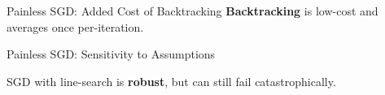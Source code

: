 \documentclass[mathserif,notheorems, hyperref={colorlinks, citecolor=blue, urlcolor=blue, linkcolor=blue}]{beamer}
\begin{document}
\begin{frame}{Painless SGD: Added Cost of Backtracking}
	\textbf{Backtracking} is low-cost and averages once per-iteration.
	\begin{figure}
	\end{figure}

\end{frame}

\begin{frame}{Painless SGD: Sensitivity to Assumptions}

	SGD with line-search is \textbf{robust}, but can still fail catastrophically.

	\begin{figure}
	\end{figure}

\end{frame}
\end{document}
